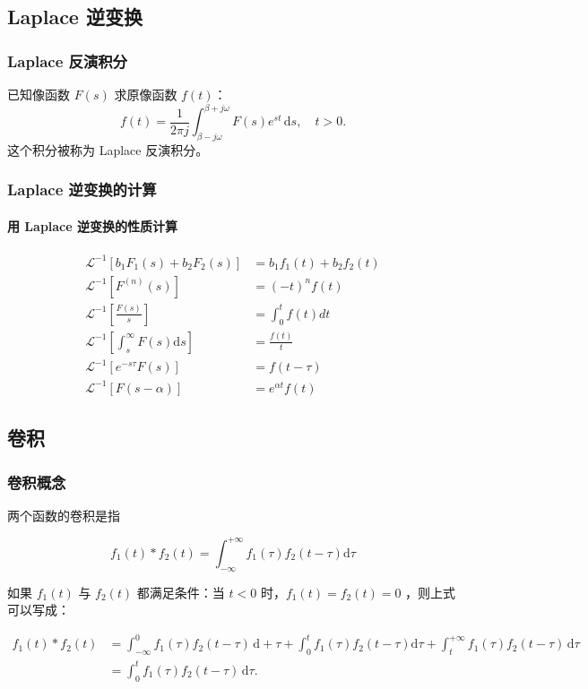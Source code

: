 \subsection{Laplace 逆变换}
\label{laplace-逆变换}
\subsubsection{Laplace 反演积分}
\label{laplace-反演积分}
已知像函数 \(F(s)\) 求原像函数 \(f(t)\)： \[
f(t)=\frac{1}{2\pi j} \int _{\beta - j\omega}^{\beta + j\omega} F(s)e^{st}\,\mathrm{d}s,\quad t > 0.
\] 这个积分被称为 Laplace 反演积分。
\subsubsection{Laplace 逆变换的计算}
\label{laplace-逆变换的计算}
\paragraph{用 Laplace 逆变换的性质计算}
\label{用-laplace-逆变换的性质计算}
\begin{align*}
\mathcal{L}^{-1}\left[b_{1} F_{1}(s)+b_{2} F_{2}(s)\right] &= b_{1} f_{1}(t)+b_{2} f_{2}(t) \\
\mathcal{L}^{-1}\left[F^{(n)}(s)\right] &= (-t)^{n} f(t) \\
\mathcal{L}^{-1}\left[\frac{F(s)}{s}\right] &= \int_{0}^{t} f(t)dt \\
\mathcal{L}^{-1}\left[\int_{s}^{\infty} F(s)\mathrm{d} s\right] &= \frac{f(t)}{t} \\
\mathcal{L}^{-1}\left[e^{-s\tau} F(s)\right] &= f(t-\tau) \\
\mathcal{L}^{-1}\left[F(s-\alpha)\right] &= e^{\alpha t}f(t)
\end{align*}
\subsection{卷积}
\label{卷积}
\subsubsection{卷积概念}
\label{卷积概念}
两个函数的卷积是指

\[
f_{1}(t) * f_{2}(t) = \int_{-\infty}^{+\infty} f_{1}(\tau) f_{2}(t-\tau) \mathrm{d} \tau
\]

如果 \(f_{1}(t)\) 与 \(f_{2}(t)\) 都满足条件：当 \(t < 0\) 时，\(f_{1}(t) = f_{2}(t) = 0\) ，则上式可以写成：

\begin{align*}
f_{1}(t) * f_{2}(t) &= \int_{-\infty}^{0} f_{1}(\tau) f_{2}(t-\tau) \,\mathrm{d} +
\tau +\int_{0}^{t} f_{1}(\tau) f_{2}(t-\tau)  \mathrm{d} \tau +
\int_{t}^{+\infty} f_{1}(\tau) f_{2}(t-\tau) \,\mathrm{d} \tau \\
&= \int_{0}^{t} f_{1}(\tau) f_{2}(t-\tau) \,\mathrm{d} \tau .
\end{align*}
